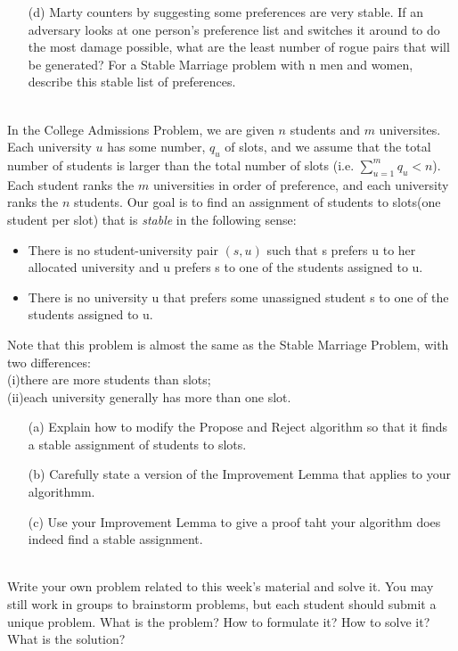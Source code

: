 \documentclass[11pt]{article}
\begin{document}
\begin{qunlist}
\begin{itemize}
\item[(d)] Marty counters by suggesting some preferences are very stable. If an adversary looks at one person's preference list and switches it around to do the most damage possible, what are the least number of rogue pairs that will be generated? For a Stable Marriage problem with n men and women, describe this stable list of preferences.


\end{itemize}


\\
In the College Admissions Problem, we are given $n$ students and $m$ universites. Each university $u$ has some number, $q_u$ of slots, and we assume that the total number of students is larger than the total number of slots
(i.e. $\sum_{u=1}^m{q_u} < n$). Each student ranks the $m$ universities in order of preference, and each university ranks the $n$ students. Our goal is to find an assignment of students to slots(one student per slot) that is
\textit{stable} in the following sense:
\begin{itemize}
\item There is no student-university pair $(s,u)$ such that s prefers u to her allocated university and u prefers s to one of the students assigned to u.
\item There is no university u that prefers some unassigned student s to one of the students assigned to u.
\end{itemize}

Note that this problem is almost the same as the Stable Marriage Problem, with two differences: \\
(i)there are more students than slots; \\
(ii)each university generally has more than one slot.

\begin{itemize}
\item[(a)] Explain how to modify the Propose and Reject algorithm so that it finds a stable assignment of students to slots.

\item[(b)] Carefully state a version of the Improvement Lemma that applies to your algorithmm.

\item[(c)] Use your Improvement Lemma to give a proof taht your algorithm does indeed find a stable assignment.

\end{itemize}











 \\

Write your own problem related to this week's material and solve it. You may still work in groups to brainstorm problems, but each student should submit a unique problem. What is the problem? How to formulate it? How to
solve it? What is the solution?


\end{qunlist}
\end{document}
